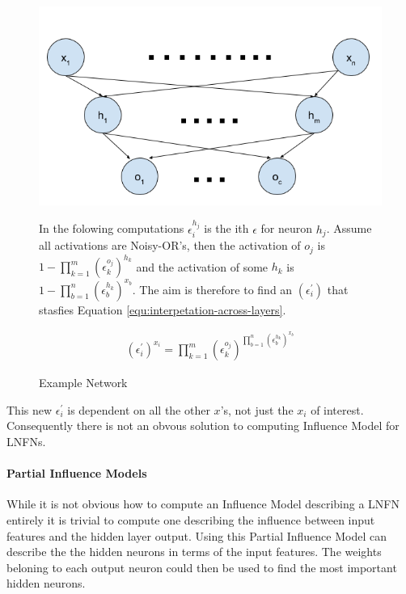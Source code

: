 \begin{figure}[H]
	\centering
	\begin{minipage}[t]{0.5\textwidth}
		\vspace{0px}
		\includegraphics[width=\textwidth]{NetworkExample.png}
		\caption{Example Network}
		\label{fig:network-example}
	\end{minipage}
	\hspace{1px}
	\begin{minipage}[t]{0.45\textwidth}
		\vspace{2px}
		 In the folowing computations $\epsilon_i^{h_j}$ is the ith $\epsilon$ for neuron $h_j$. Assume all activations are Noisy-OR's, then the activation of $o_j$ is $1 - \prod^m_{k=1} (\epsilon_k^{o_j})^{h_k}$ and the activation of some $h_k$ is $1 - \prod^n_{b=1} (\epsilon_b^{h_k})^{x_b}$. The aim is therefore to find an $(\epsilon^{'}_i)$ that stasfies Equation \ref{equ:interpetation-across-layers}.
	
		\begin{align}
			(\epsilon^{'}_i)^{x_i} = \prod_{k = 1}^{m} (\epsilon^{o_j}_k)^{\prod_{b = 1}^{n} (\epsilon^{h_k}_b)^{x_b}}
			\label{equ:interpetation-across-layers}
		\end{align}
	\end{minipage}
	\hfill
\end{figure}

This new $\epsilon^{'}_i$ is dependent on all the other $x$'s, not just the $x_i$ of interest. Consequently there is not an obvous solution to computing Influence Model for LNFNs.

\paragraph{Partial Influence Models}
While it is not obvious how to compute an Influence Model describing a LNFN entirely it is trivial to compute one describing the influence between input features and the hidden layer output. Using this Partial Influence Model can describe the the hidden neurons in terms of the input features. The weights beloning to each output neuron could then be used to find the most important hidden neurons.


